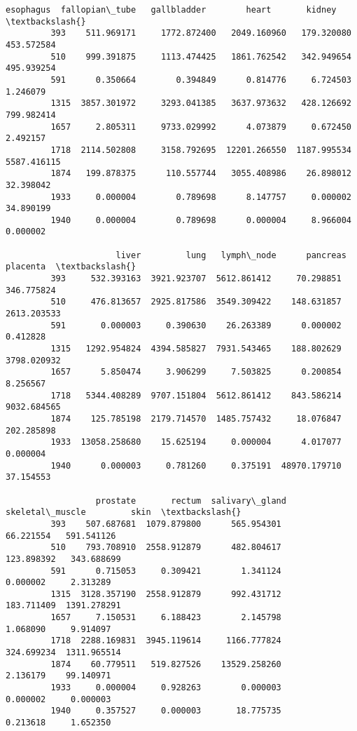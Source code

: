 \documentclass[11pt]{article}
\begin{document}
\begin{Verbatim}[commandchars=\\\{\}]
                 esophagus  fallopian\_tube   gallbladder        heart       kidney  \textbackslash{}
         393    511.969171     1772.872400   2049.160960   179.320080   453.572584   
         510    999.391875     1113.474425   1861.762542   342.949654   495.939254   
         591      0.350664        0.394849      0.814776     6.724503     1.246079   
         1315  3857.301972     3293.041385   3637.973632   428.126692   799.982414   
         1657     2.805311     9733.029992      4.073879     0.672450     2.492157   
         1718  2114.502808     3158.792695  12201.266550  1187.995534  5587.416115   
         1874   199.878375      110.557744   3055.408986    26.898012    32.398042   
         1933     0.000004        0.789698      8.147757     0.000002    34.890199   
         1940     0.000004        0.789698      0.000004     8.966004     0.000002   
         
                      liver         lung   lymph\_node      pancreas     placenta  \textbackslash{}
         393     532.393163  3921.923707  5612.861412     70.298851   346.775824   
         510     476.813657  2925.817586  3549.309422    148.631857  2613.203533   
         591       0.000003     0.390630    26.263389      0.000002     0.412828   
         1315   1292.954824  4394.585827  7931.543465    188.802629  3798.020932   
         1657      5.850474     3.906299     7.503825      0.200854     8.256567   
         1718   5344.408289  9707.151804  5612.861412    843.586214  9032.684565   
         1874    125.785198  2179.714570  1485.757432     18.076847   202.285898   
         1933  13058.258680    15.625194     0.000004      4.017077     0.000004   
         1940      0.000003     0.781260     0.375191  48970.179710    37.154553   
         
                  prostate       rectum  salivary\_gland  skeletal\_muscle         skin  \textbackslash{}
         393    507.687681  1079.879800      565.954301        66.221554   591.541126   
         510    793.708910  2558.912879      482.804617       123.898392   343.688699   
         591      0.715053     0.309421        1.341124         0.000002     2.313289   
         1315  3128.357190  2558.912879      992.431712       183.711409  1391.278291   
         1657     7.150531     6.188423        2.145798         1.068090     9.914097   
         1718  2288.169831  3945.119614     1166.777824       324.699234  1311.965514   
         1874    60.779511   519.827526    13529.258260         2.136179    99.140971   
         1933     0.000004     0.928263        0.000003         0.000002     0.000003   
         1940     0.357527     0.000003       18.775735         0.213618     1.652350   
         

\end{Verbatim}
\end{document}
